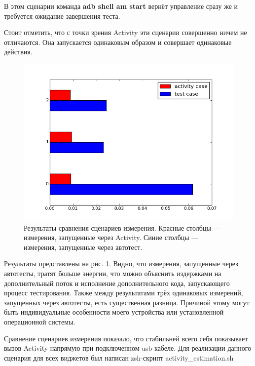 \documentclass[a4paper,14pt]{extarticle} %
\begin{document}
	В этом сценарии команда \textbf{adb shell am start} вернёт управление сразу же и требуется ожидание завершения теста.
	
	Стоит отметить, что с точки зрения Activity эти сценарии совершенно ничем не отличаются. Она запускается одинаковым образом и совершает одинаковые действия.
	
	\begin{figure}[tbh]
		\includegraphics[width=\textwidth]{test_comparation}
		\caption{Результаты сравнения  сценариев измерения. Красные столбцы --- измерения, запущенные через Activity. Синие столбцы --- измерения, запущенные через автотест.}
		\label{fig:test_comparation}
	\end{figure}

	Результаты представлены на рис. \ref{fig:test_comparation}. Видно, что измерения, запущенные через автотесты, тратят больше энергии, что можно объяснить издержками на дополнительный поток и исполнение дополнительного кода, запускающего процесс тестирования. Также между результатами трёх одинаковых измерений, запущенных через автотесты, есть существенная разница. Причиной этому могут быть индивидуальные особенности моего устройства или  установленной операционной системы.
	
	Сравнение сценариев измерения показало, что стабильней всего себя показывает вызов Activity напрямую при подключенном usb-кабеле. Для реализации данного сценария для всех виджетов был написан zsh-скрипт activity\_estimation.sh~\ris{\ref{fig:activity_estimation}}
	
\end{document}
